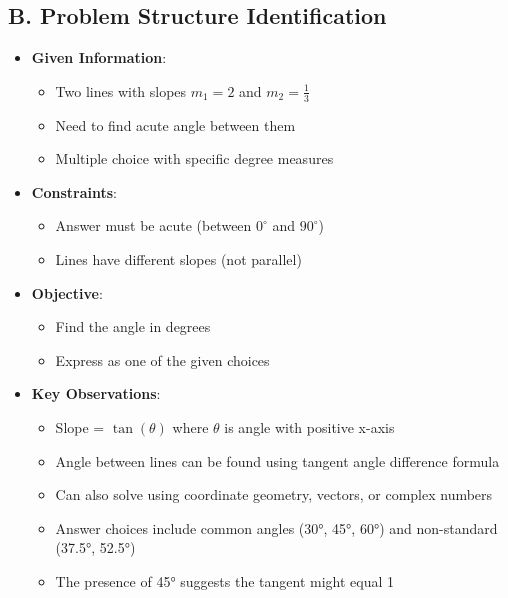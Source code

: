 \documentclass[12pt]{article}
\begin{document}
\begin{problemconfigbox}
\subsection*{B. Problem Structure Identification}
\begin{itemize}[leftmargin=*]
    \item \textbf{Given Information}: 
    \begin{itemize}
        \item Two lines with slopes $m_1 = 2$ and $m_2 = \frac{1}{3}$
        \item Need to find acute angle between them
        \item Multiple choice with specific degree measures
    \end{itemize}
    \item \textbf{Constraints}: 
    \begin{itemize}
        \item Answer must be acute (between $0^\circ$ and $90^\circ$)
        \item Lines have different slopes (not parallel)
    \end{itemize}
    \item \textbf{Objective}: 
    \begin{itemize}
        \item Find the angle in degrees
        \item Express as one of the given choices
    \end{itemize}
    \item \textbf{Key Observations}: 
    \begin{itemize}
        \item Slope = $\tan(\theta)$ where $\theta$ is angle with positive x-axis
        \item Angle between lines can be found using tangent angle difference formula
        \item Can also solve using coordinate geometry, vectors, or complex numbers
        \item Answer choices include common angles (30°, 45°, 60°) and non-standard (37.5°, 52.5°)
        \item The presence of 45° suggests the tangent might equal 1
    \end{itemize}
\end{itemize}


\end{problemconfigbox}
\end{document}
